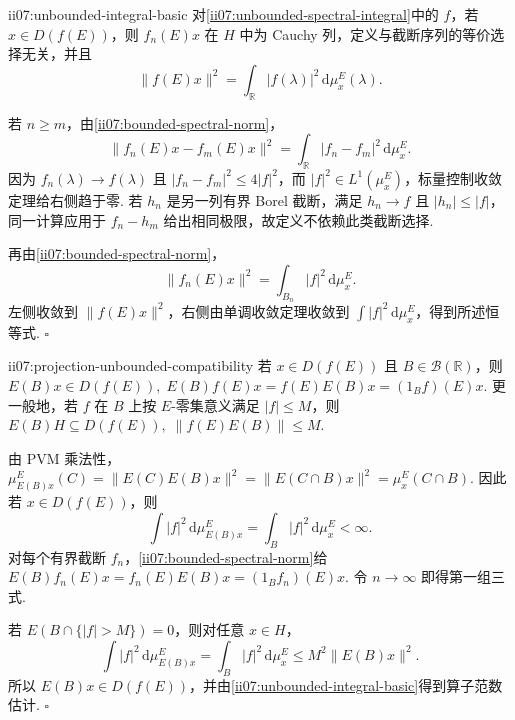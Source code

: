 \begin{FAProposition}[B][无界谱积分的良定义与范数恒等式]{ii07:unbounded-integral-basic}
对\autoref{ii07:unbounded-spectral-integral}中的 \(\displaystyle f\)，若 \(\displaystyle x\in D(f(E))\)，则 \(\displaystyle f_n(E)x\) 在 \(\displaystyle H\) 中为 Cauchy 列，定义与截断序列的等价选择无关，并且
\[
\|f(E)x\|^2
=
\int_{\mathbb R}|f(\lambda)|^2\,\mathrm{d}\mu_x^E(\lambda).
\]
\end{FAProposition}

\begin{FAProof}
若 \(\displaystyle n\geqslant m\)，由\autoref{ii07:bounded-spectral-norm}，
\[
\|f_n(E)x-f_m(E)x\|^2
=
\int_{\mathbb R}|f_n-f_m|^2\,\mathrm{d}\mu_x^E.
\]
因为 \(\displaystyle f_n(\lambda)\to f(\lambda)\) 且 \(\displaystyle|f_n-f_m|^2\leqslant4|f|^2\)，而 \(\displaystyle|f|^2\in L^1(\mu_x^E)\)，标量控制收敛定理给右侧趋于零. 若 \(\displaystyle h_n\) 是另一列有界 Borel 截断，满足 \(\displaystyle h_n\to f\) 且 \(\displaystyle|h_n|\leqslant|f|\)，同一计算应用于 \(\displaystyle f_n-h_m\) 给出相同极限，故定义不依赖此类截断选择.

再由\autoref{ii07:bounded-spectral-norm}，
\[
\|f_n(E)x\|^2
=
\int_{B_n}|f|^2\,\mathrm{d}\mu_x^E.
\]
左侧收敛到 \(\displaystyle\|f(E)x\|^2\)，右侧由单调收敛定理收敛到 \(\displaystyle\int|f|^2\,\mathrm{d}\mu_x^E\)，得到所述恒等式.
\hfill\(\square\)
\end{FAProof}

\begin{FAProposition}[C][谱投影与无界谱积分兼容]{ii07:projection-unbounded-compatibility}
若 \(\displaystyle x\in D(f(E))\) 且 \(\displaystyle B\in\mathcal B(\mathbb R)\)，则
\(\displaystyle E(B)x\in D(f(E)), \; E(B)f(E)x=f(E)E(B)x=(1_Bf)(E)x.\)
更一般地，若 \(\displaystyle f\) 在 \(\displaystyle B\) 上按 \(\displaystyle E\)-零集意义满足 \(\displaystyle|f|\leqslant M\)，则
\(\displaystyle E(B)H\subseteq D(f(E)), \; \|f(E)E(B)\|\leqslant M.\)
\end{FAProposition}

\begin{FAProof}
由 PVM 乘法性，
\(\displaystyle \mu_{E(B)x}^E(C) = \|E(C)E(B)x\|^2 = \|E(C\cap B)x\|^2 = \mu_x^E(C\cap B).\)
因此若 \(\displaystyle x\in D(f(E))\)，则
\[
\int|f|^2\,\mathrm{d}\mu_{E(B)x}^E
=
\int_B|f|^2\,\mathrm{d}\mu_x^E<\infty.
\]
对每个有界截断 \(\displaystyle f_n\)，\autoref{ii07:bounded-spectral-norm}给
\(\displaystyle E(B)f_n(E)x=f_n(E)E(B)x=(1_Bf_n)(E)x.\)
令 \(\displaystyle n\to\infty\) 即得第一组三式.

若 \(\displaystyle E(B\cap\{|f|>M\})=0\)，则对任意 \(\displaystyle x\in H\)，
\[
\int|f|^2\,\mathrm{d}\mu_{E(B)x}^E
=
\int_B|f|^2\,\mathrm{d}\mu_x^E
\leqslant
M^2\|E(B)x\|^2.
\]
所以 \(\displaystyle E(B)x\in D(f(E))\)，并由\autoref{ii07:unbounded-integral-basic}得到算子范数估计.
\hfill\(\square\)
\end{FAProof}

